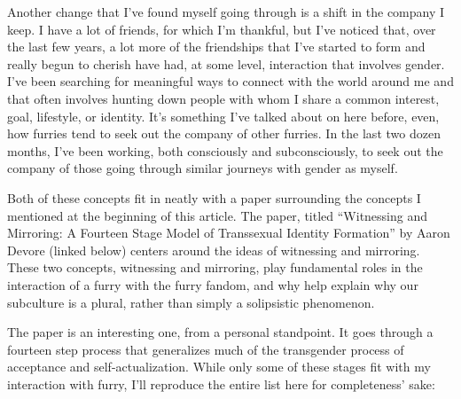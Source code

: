 Another change that I've found myself going through is a shift in the
company I keep. I have a lot of friends, for which I'm thankful, but
I've noticed that, over the last few years, a lot more of the
friendships that I've started to form and really begun to cherish have
had, at some level, interaction that involves gender. I've been
searching for meaningful ways to connect with the world around me and
that often involves hunting down people with whom I share a common
interest, goal, lifestyle, or identity. It's something I've talked about
on here before, even, how furries tend to seek out the company of other
furries. In the last two dozen months, I've been working, both
consciously and subconsciously, to seek out the company of those going
through similar journeys with gender as myself.

Both of these concepts fit in neatly with a paper surrounding the
concepts I mentioned at the beginning of this article. The paper, titled
``Witnessing and Mirroring: A Fourteen Stage Model of Transsexual
Identity Formation'' by Aaron Devore (linked below) centers around the
ideas of witnessing and mirroring. These two concepts, witnessing and
mirroring, play fundamental roles in the interaction of a furry with the
furry fandom, and why help explain why our subculture is a plural,
rather than simply a solipsistic phenomenon.

The paper is an interesting one, from a personal standpoint. It goes
through a fourteen step process that generalizes much of the transgender
process of acceptance and self-actualization. While only some of these
stages fit with my interaction with furry, I'll reproduce the entire
list here for completeness' sake:

